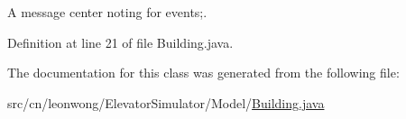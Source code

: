 A message center noting for events;. 



Definition at line 21 of file Building.\+java.



The documentation for this class was generated from the following file\+:\begin{DoxyCompactItemize}
\item 
src/cn/leonwong/\+Elevator\+Simulator/\+Model/\hyperlink{_building_8java}{Building.\+java}\end{DoxyCompactItemize}
